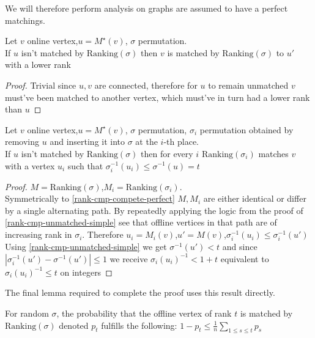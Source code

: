 We will therefore perform analysis on graphs are assumed to have a perfect matchings.

\begin{lemma}
	\label{rank-cmp-unmatched-simple}
	Let $v$ online vertex,$u=M^\star(v)$, $\sigma$ permutation.\\
	If $u$ isn't matched by $\mathrm{Ranking}(\sigma)$ then $v$ is matched by $\mathrm{Ranking}(\sigma)$ to $u'$ with a lower rank
\end{lemma}

\begin{proof}
	Trivial since $u,v$ are connected, therefore for $u$ to remain unmatched $v$ must've been matched to another vertex, which must've in turn had a lower rank than $u$
\end{proof}

\begin{lemma}
	\label{rank-cmp-unmatched-complicated}
	Let $v$ online vertex,$u=M^\star(v)$, $\sigma$ permutation, $\sigma_i$ permutation obtained by removing $u$ and inserting it into $\sigma$ at the $i$-th place.\\
	If $u$ isn't matched by $\mathrm{Ranking}(\sigma)$ then for every $i$ $\mathrm{Ranking}(\sigma_i)$ matches $v$ with a vertex $u_i$ such that $\sigma^{-1}_i(u_i)\leq\sigma^{-1}(u)=t$
\end{lemma}

\begin{proof}
	$M=\mathrm{Ranking}(\sigma)$,$M_i=\mathrm{Ranking}(\sigma_i)$.\\ Symmetrically to \autoref{rank-cmp-compete-perfect} $M,M_i$ are either identical or differ by a single alternating path. By repeatedly applying the logic from the proof of \autoref{rank-cmp-unmatched-simple} see that offline vertices in that path are of increasing rank in $\sigma_i$. Therefore $u_i=M_i(v)$,$u'=M(v)$,$\sigma_i^{-1}(u_i)\leq\sigma_i^{-1}(u')$\\
	Using \autoref{rank-cmp-unmatched-simple} we get $\sigma^{-1}(u')<t$ and since $|\sigma_i^{-1}(u')-\sigma^{-1}(u')|\leq 1$ we receive $\sigma_i(u_i)^{-1}<1+t$ equivalent to $\sigma_i(u_i)^{-1}\leq t$ on integers
\end{proof}

The final lemma required to complete the proof uses this result directly.

\begin{lemma}
	\label{rank-cmp-probability}
	For random $\sigma$, the probability that the offline vertex of rank $t$ is matched by $\mathrm{Ranking}(\sigma)$ denoted $p_t$ fulfills the following: $1-p_t\leq\frac{1}{n}\sum\limits_{1\leq s\leq t}p_s$
\end{lemma}

